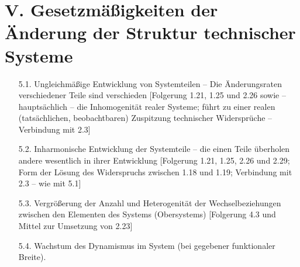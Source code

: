 \documentclass[11pt,a4paper]{article}
\begin{document}
\section*{V. Gesetzmäßigkeiten der Änderung der Struktur technischer Systeme}
\begin{itemize}
\item[5.1.] Ungleichmäßige Entwicklung von Systemteilen -- Die Änderungsraten
  verschiedener Teile sind verschieden [Folgerung 1.21, 1.25 und 2.26 sowie --
    hauptsächlich -- die Inhomogenität realer Systeme; führt zu einer realen
    (tatsächlichen, beobachtbaren) Zuspitzung technischer Widersprüche --
    Verbindung mit 2.3]
\item[5.2.] Inharmonische Entwicklung der Systemteile -- die einen Teile
  überholen andere wesentlich in ihrer Entwicklung [Folgerung 1.21, 1.25, 2.26
    und 2.29; Form der Lösung des Widerspruchs zwischen 1.18 und 1.19;
    Verbindung mit 2.3 -- wie mit 5.1]
\item[5.3.] Vergrößerung der Anzahl und Heterogenität der Wechselbeziehungen
  zwischen den Elementen des Systems (Obersystems) [Folgerung 4.3 und Mittel
    zur Umsetzung von 2.23]
\item[5.4.] Wachstum des Dynamismus im System (bei gegebener funktionaler
  Breite).


\end{itemize}
\end{document}
